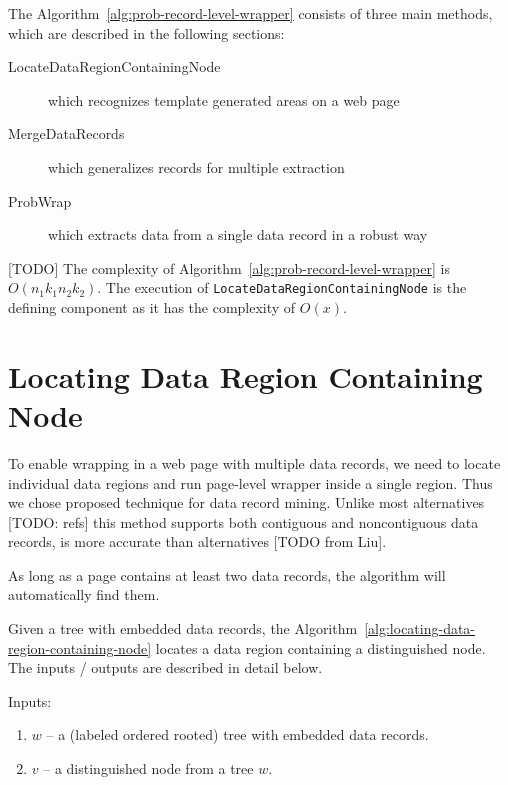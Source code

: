

The Algorithm~\ref{alg:prob-record-level-wrapper} consists of three main methods, which are described in the following sections:
\begin{description}
	\item[LocateDataRegionContainingNode] which recognizes template generated areas on a web page
	\item[MergeDataRecords] which generalizes records for multiple extraction
	\item[ProbWrap] which extracts data from a single data record in a robust way
\end{description}

[TODO] The complexity of Algorithm~\ref{alg:prob-record-level-wrapper} is $O(n_1 k_1 n_2 k_2)$. The execution of \texttt{LocateDataRegionContainingNode} is the defining component as it has the complexity of $O(x)$.


\section{Locating Data Region Containing Node}

To enable wrapping in a web page with multiple data records, we need to locate individual data regions and run page-level wrapper inside a single region. Thus we chose \cite{liu2009a} proposed technique for data record mining. Unlike most alternatives [TODO: refs] this method supports both contiguous and noncontiguous data records, is more accurate than alternatives [TODO from Liu].

As long as a page contains at least two data records, the algorithm will automatically find them.

Given a tree with embedded data records, the Algorithm~\ref{alg:locating-data-region-containing-node} locates a data region containing a distinguished node. The inputs / outputs are described in detail below.

Inputs: 

\begin{enumerate}
	\item $w$ -- a (labeled ordered rooted) tree with embedded data records.
	\item $v$ -- a distinguished node from a tree $w$.
\end{enumerate}

